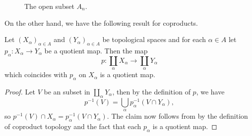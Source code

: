 \begin{example}
\begin{figure}[htbp]
\caption{The open subset $A_n$.}
\end{figure}
\end{example}
On the other hand, we have the following result for coproducts.
\begin{proposition}\label{topo space coproduct of quotient map is quotient}
Let $(X_\alpha)_{\alpha\in A}$ and $(Y_\alpha)_{\alpha\in A}$ be topological spaces and for each $\alpha\in A$ let $p_\alpha:X_\alpha\to Y_\alpha$ be a quotient map. Then the map
\[p:\coprod_\alpha X_\alpha\to\coprod_\alpha Y_\alpha\]
which coincides with $p_\alpha$ on $X_\alpha$ is a quotient map.
\end{proposition}
\begin{proof}
Let $V$ be an subset in $\coprod_\alpha Y_\alpha$, then by the definition of $p$, we have
\[p^{-1}(V)=\bigcup_\alpha p_\alpha^{-1}(V\cap Y_\alpha),\]
so $p^{-1}(V)\cap X_\alpha=p_\alpha^{-1}(V\cap Y_\alpha)$. The claim now follows from by the definition of coproduct topology and the fact that each $p_\alpha$ is a quotient map.
\end{proof}
